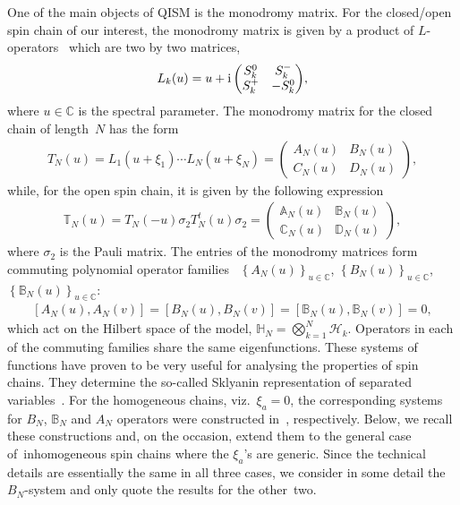 \documentclass[pdftex]{sigma}%
\numberwithin{equation}{section}
\begin{document}
One of the main objects of QISM is the monodromy matrix. For the closed/open spin chain of our interest, the monodromy matrix is given by a
product of $L$-operators~\cite{Faddeev:1979gh} which are two by two matrices,
\begin{gather*}
L_k(u)=u+{\rm i}
\begin{pmatrix}
S^0_k& S^-_k\\
S^+_k &-S_k^0
\end{pmatrix}\!,
\end{gather*}
where $u\in \mathbb C$ is the spectral parameter. The monodromy matrix for the closed chain of length~$N$ has the
form~\cite{Faddeev:1979gh}
\begin{gather*}%
T_N(u) =L_1(u+\xi_1)\cdots L_N(u+\xi_N)=\begin{pmatrix}
A_N(u)& B_N(u)\\
C_N(u) & D_N(u)
\end{pmatrix}\!,
\end{gather*}
while, for the open spin chain, it is given by the following expression~\cite{MR953215}
\begin{gather}\label{Topen}
\mathbb{T}_N(u) = T_N(-u) \sigma_2 T_N^{t} (u)\sigma_2 = \begin{pmatrix}
\mathbb{A}_N(u) & \mathbb{B}_N(u)\\
\mathbb{C}_N(u) & \mathbb{D}_N(u)
\end{pmatrix}\!,
\end{gather}
where $\sigma_2$ is the Pauli matrix. The entries of the monodromy matrices form commuting polynomial operator families~\cite{MR953215,Faddeev:1979gh} $\left\{A_N(u)\right\}_{u \in \mathbb{C} }$,
$\left\{B_N(u)\right\}_{u \in \mathbb{C}}$, $\left\{\mathbb{B}_N(u)\right\}_{u \in \mathbb{C}}$:
\begin{gather*}
 \left[A_N(u),A_N(v)\right]=\left[B_N(u),B_N(v)\right]=\left[\mathbb B_N(u),\mathbb B_N(v)\right]=0,
\end{gather*}
which act on the Hilbert space of the model, $\mathbb H_N=\bigotimes_{k=1}^N \mathcal H_k$. Operators in each of the commuting families
share the same eigenfunctions. These systems of functions have proven to be very useful for analysing the properties of spin chains.
They determine the so-called Sklyanin representation of separated variables~\cite{MR1239668}. For the homogeneous chains, viz.~$\xi_a=0$, the corresponding systems for $B_N$, $\mathbb B_N$ and $A_N$ operators were constructed in~\cite{Belitsky:2014rba,Derkachov:2003qb,Derkachov:2002tf}, respectively. Below, we recall these constructions and, on the occasion,
extend them to the general case of~inho\-mo\-ge\-neous spin chains where the $\xi_a$'s are generic. Since the technical details are essentially
the same in all three cases, we consider in some detail the $B_N$-system and only quote the results for the other~two.
\end{document}
